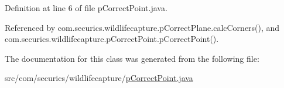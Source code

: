 Definition at line 6 of file p\+Correct\+Point.\+java.



Referenced by com.\+securics.\+wildlifecapture.\+p\+Correct\+Plane.\+calc\+Corners(), and com.\+securics.\+wildlifecapture.\+p\+Correct\+Point.\+p\+Correct\+Point().



The documentation for this class was generated from the following file\+:\begin{DoxyCompactItemize}
\item 
src/com/securics/wildlifecapture/\hyperlink{p_correct_point_8java}{p\+Correct\+Point.\+java}\end{DoxyCompactItemize}
